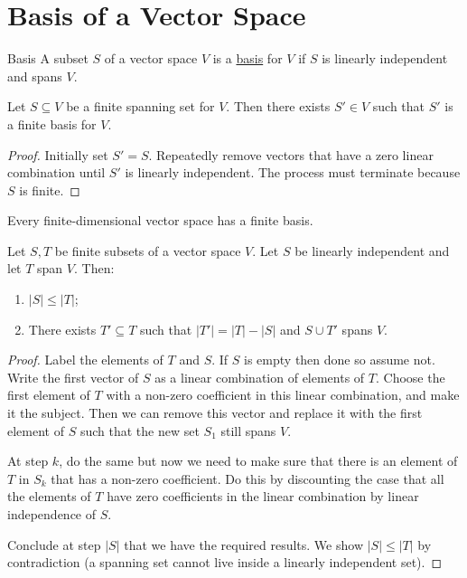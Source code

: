 \documentclass[../Main.tex]{subfiles}
\begin{document}
\section{Basis of a Vector Space}
\begin{definition}{Basis}
    A subset $S$ of a vector space $V$ is a  \underline{basis} for $V$ if $S$ is linearly independent and spans $V$.
\end{definition}
\begin{proposition}
    Let $S \subseteq V$ be a finite spanning set for $V$. Then there exists $S' \in V$ such that $S'$ is a finite basis for $V$.
    \label{propFiniteSpanFiniteBasis}
\end{proposition}
\begin{proof}
    Initially set $S' = S$. Repeatedly remove vectors that have a zero linear combination until $S'$ is linearly independent. The process must terminate because $S$ is finite.
\end{proof}
\begin{corollary}
    Every finite-dimensional vector space has a finite basis.
    \label{corFinDimFinBasis}
\end{corollary}
\begin{theorem}
    Let $S, T$ be finite subsets of a vector space $V$. Let $S$ be linearly independent and let $T$ span $V$. Then:
    \begin{enumerate}
        \item $|S| \leq |T|$;
        \item There exists $T' \subseteq T$ such that $|T'| = |T| - |S|$ and $S \cup T'$ spans $V$.
    \end{enumerate}
    \label{thmSteinitzExchange}
\end{theorem}
\begin{proof}
    Label the elements of $T$ and $S$. If $S$ is empty then done so assume not. Write the first vector of $S$ as a linear combination of elements of $T$. Choose the first element of $T$ with a non-zero coefficient in this linear combination, and make it the subject. Then we can remove this vector and replace it with the first element of $S$ such that the new set $S_1$ still spans $V$.

    At step $k$, do the same but now we need to make sure that there is an element of $T$ in $S_k$ that has a non-zero coefficient. Do this by discounting the case that all the elements of $T$ have zero coefficients in the linear combination by linear independence of $S$.

    Conclude at step $|S|$ that we have the required results. We show $|S| \leq |T|$ by contradiction (a spanning set cannot live inside a linearly independent set).
\end{proof}
\end{document}

